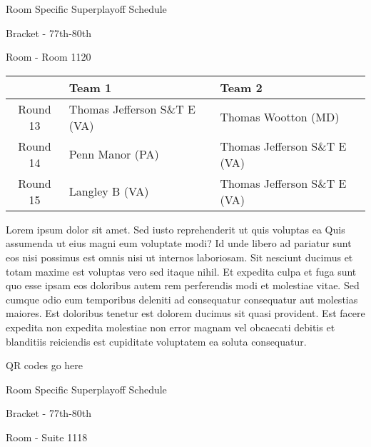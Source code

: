 \documentclass{article}%
\begin{document}
\newpage%
\begin{center}%
\begin{Huge}%
Room Specific Superplayoff Schedule%
\end{Huge}%
\vspace*{8pt}%
\linebreak%
\begin{Large}%
Bracket {-} 77th{-}80th%
\end{Large}%
\vspace*{8pt}%
\linebreak%
\vspace*{8pt}%
\begin{Large}%
Room {-} Room 1120%
\end{Large}%
\end{center}%
%
\begin{tabularx}{\textwidth}{|c|Y|Y|}%
\hline%
&Team 1&Team 2\\%
\hline%
Round 13&Thomas Jefferson S\&T E (VA)&Thomas Wootton (MD)\\%
Round 14&Penn Manor (PA)&Thomas Jefferson S\&T E (VA)\\%
Round 15&Langley B (VA)&Thomas Jefferson S\&T E (VA)\\%
\hline%
\end{tabularx}%
\vspace*{8pt}%
\newline%
Lorem ipsum dolor sit amet. Sed iusto reprehenderit ut quis voluptas ea Quis assumenda ut eius magni eum voluptate modi? Id unde libero ad pariatur sunt eos nisi possimus est omnis nisi ut internos laboriosam. Sit nesciunt ducimus et totam maxime est voluptas vero sed itaque nihil. Et expedita culpa et fuga sunt quo esse ipsam eos doloribus autem rem perferendis modi et molestiae vitae.\newline%
\newline%
Sed cumque odio eum temporibus deleniti ad consequatur consequatur aut molestias maiores. Est doloribus tenetur est dolorem ducimus sit quasi provident. Est facere expedita non expedita molestiae non error magnam vel obcaecati debitis et blanditiis reiciendis est cupiditate voluptatem ea soluta consequatur.%
\vspace*{140pt}%
\begin{center}%
\begin{Huge}%
QR codes go here%
\end{Huge}%
\end{center}%
\newpage%
\begin{center}%
\begin{Huge}%
Room Specific Superplayoff Schedule%
\end{Huge}%
\vspace*{8pt}%
\linebreak%
\begin{Large}%
Bracket {-} 77th{-}80th%
\end{Large}%
\vspace*{8pt}%
\linebreak%
\vspace*{8pt}%
\begin{Large}%
Room {-} Suite 1118%
\end{Large}%
\end{center}%
\end{document}
